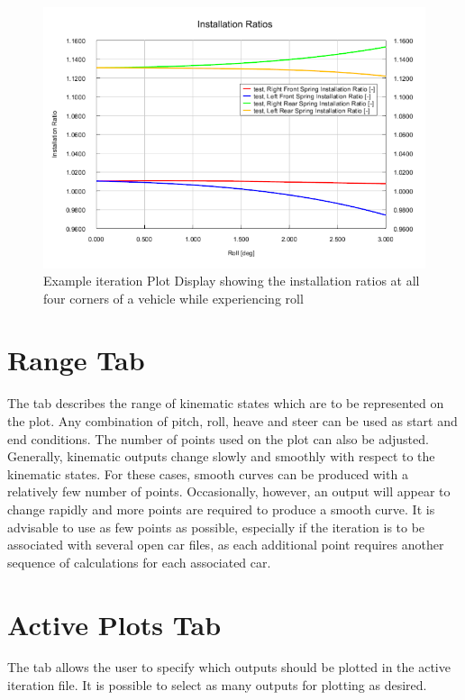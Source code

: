 \begin{figure}
  \includegraphics[width=\textwidth]{images/iteration}
  \caption{Example iteration Plot Display showing the installation ratios at all four corners of a vehicle while experiencing roll} \label{fig:iteration}
  \centering
\end{figure}

\section{Range Tab} \label{sec:rangeTab}

The  tab describes the range of kinematic states which are to be represented on the plot.  Any combination of pitch, roll, heave and steer can be used as start and end conditions.  The number of points used on the plot can also be adjusted.  Generally, kinematic outputs change slowly and smoothly with respect to the kinematic states.  For these cases, smooth curves can be produced with a relatively few number of points.  Occasionally, however, an output will appear to change rapidly and more points are required to produce a smooth curve.  It is advisable to use as few points as possible, especially if the iteration is to be associated with several open car files, as each additional point requires another sequence of calculations for each associated car.

\section{Active Plots Tab} \label{sec:activePlotsTab}

The  tab allows the user to specify which outputs should be plotted in the active iteration file.  It is possible to select as many outputs for plotting as desired.

